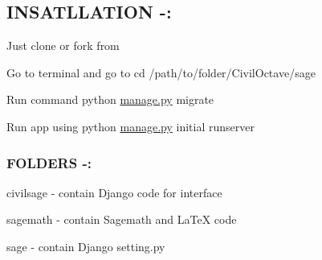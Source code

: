 \subsection*{I\+N\+S\+A\+T\+L\+L\+A\+T\+I\+O\+N -\/\+:}


\begin{DoxyEnumerate}
\item Just clone or fork from
\item Go to terminal and go to cd /path/to/folder/\+Civil\+Octave/sage
\item Run command python \hyperlink{manage_8py}{manage.\+py} migrate
\item Run app using python \hyperlink{manage_8py}{manage.\+py} initial runserver
\end{DoxyEnumerate}

\subsubsection*{F\+O\+L\+D\+E\+R\+S -\/\+:}


\begin{DoxyEnumerate}
\item civilsage -\/ contain Django code for interface
\item sagemath -\/ contain Sagemath and La\+Te\+X code
\item sage -\/ contain Django setting.\+py 
\end{DoxyEnumerate}
